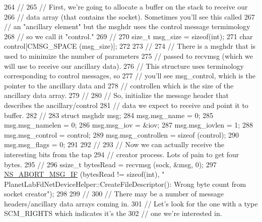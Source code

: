 \begin{DoxyCode}
264       \textcolor{comment}{//}
265       \textcolor{comment}{// First, we're going to allocate a buffer on the stack to receive our}
266       \textcolor{comment}{// data array (that contains the socket).  Sometimes you'll see this called}
267       \textcolor{comment}{// an "ancillary element" but the msghdr uses the control message termimology}
268       \textcolor{comment}{// so we call it "control."}
269       \textcolor{comment}{//}
270       \textcolor{keywordtype}{size\_t} msg\_size = \textcolor{keyword}{sizeof}(int);
271       \textcolor{keywordtype}{char} control[CMSG\_SPACE (msg\_size)];
272 
273       \textcolor{comment}{//}
274       \textcolor{comment}{// There is a msghdr that is used to minimize the number of parameters}
275       \textcolor{comment}{// passed to recvmsg (which we will use to receive our ancillary data).}
276       \textcolor{comment}{// This structure uses terminology corresponding to control messages, so}
277       \textcolor{comment}{// you'll see msg\_control, which is the pointer to the ancillary data and}
278       \textcolor{comment}{// controllen which is the size of the ancillary data array.}
279       \textcolor{comment}{//}
280       \textcolor{comment}{// So, initialize the message header that describes the ancillary/control}
281       \textcolor{comment}{// data we expect to receive and point it to buffer.}
282       \textcolor{comment}{//}
283       \textcolor{keyword}{struct }msghdr msg;
284       msg.msg\_name = 0;
285       msg.msg\_namelen = 0;
286       msg.msg\_iov = &iov;
287       msg.msg\_iovlen = 1;
288       msg.msg\_control = control;
289       msg.msg\_controllen = \textcolor{keyword}{sizeof} (control);
290       msg.msg\_flags = 0;
291 
292       \textcolor{comment}{//}
293       \textcolor{comment}{// Now we can actually receive the interesting bits from the tap}
294       \textcolor{comment}{// creator process.  Lots of pain to get four bytes.}
295       \textcolor{comment}{//}
296       ssize\_t bytesRead = recvmsg (sock, &msg, 0);
297       \hyperlink{group__fatal_ga6653324225bc139e46deea177614ceee}{NS\_ABORT\_MSG\_IF} (bytesRead != \textcolor{keyword}{sizeof}(\textcolor{keywordtype}{int}), \textcolor{stringliteral}{"
      PlanetLabFdNetDeviceHelper::CreateFileDescriptor(): Wrong byte count from socket creator"});
298 
299       \textcolor{comment}{//}
300       \textcolor{comment}{// There may be a number of message headers/ancillary data arrays coming in.}
301       \textcolor{comment}{// Let's look for the one with a type SCM\_RIGHTS which indicates it's the}
302       \textcolor{comment}{// one we're interested in.}

\end{DoxyCode}
